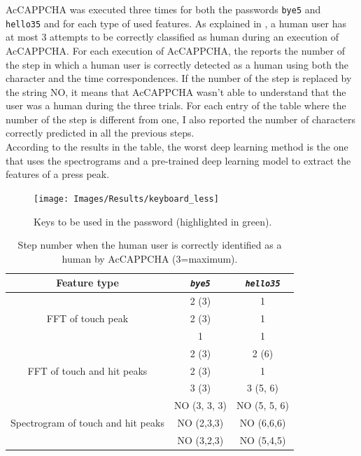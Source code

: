AcCAPPCHA was executed three times for both the passwords \texttt{bye5} and \texttt{hello35} and for each type of used features. As explained in , a human user has at most 3 attempts to be correctly classified as human during an execution of AcCAPPCHA. For each execution of AcCAPPCHA, the  reports the number of the step in which a human user is correctly detected as a human using both the character and the time correspondences. If the number of the step is replaced by the string NO, it means that AcCAPPCHA wasn't able to understand that the user was a human during the three trials. For each entry of the table where the number of the step is different from one, I also reported the number of characters correctly predicted in all the previous steps.\\
According to the results in the table, the worst deep learning method is the one that uses the spectrograms and a pre-trained deep learning model to extract the features of a press peak.
\begin{figure}[H]
     \centering
	 \texttt{[image: Images/Results/keyboard\_less]}
     \caption{\footnotesize{Keys to be used in the password (highlighted in green).}}\label{Results:keyboard}
\end{figure}
\begin{table}[h]
\centering\footnotesize
\begin{tabular}{ccc}
\hline
{\textbf{Feature type}}&{\texttt{\textit{bye5}}}&{\texttt{\textit{hello35}}}\\
\hline
\multirow{3}{*}{FFT of touch peak} & {2 (3)} & {1}\\
& {2 (3)} & {1}\\
& {1} & {1}\\
\hline
\multirow{3}{*}{FFT of touch and hit peaks} & {2 (3)} & {2 (6)}\\
& {2 (3)} & {1}\\
& {3 (3)} & {3 (5, 6)}\\
\hline
\multirow{3}{*}{Spectrogram of touch and hit peaks} & {NO (3, 3, 3)} & {NO (5, 5, 6)}\\
& {NO (2,3,3)} & {NO (6,6,6)}\\
& {NO (3,2,3)} & {NO (5,4,5)}\\
\hline
\end{tabular}
\caption{\footnotesize{Step number when the human user is correctly identified as a human by AcCAPPCHA (3=maximum).}}
\label{Results:verification}
\end{table}

